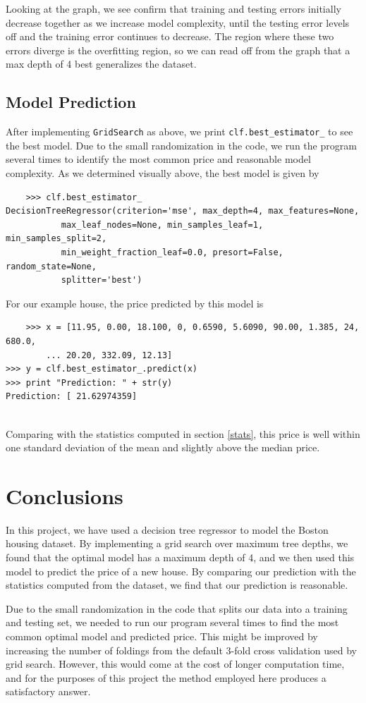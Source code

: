 \documentclass[12 pt]{article}
\numberwithin{equation}{section}
\begin{document}
Looking at the graph, we see confirm that training and testing errors initially decrease together as we increase model complexity, until the testing error levels off and the training error continues to decrease. The region where these two errors diverge is the overfitting region, so we can read off from the graph that a max depth of 4 best generalizes the dataset.

\newpage

\subsection{Model Prediction}
After implementing \texttt{GridSearch} as above, we print \texttt{clf.best\_estimator\_} to see the best model. Due to the small randomization in the code, we run the program several times to identify the most common price and reasonable model complexity. As we determined visually above, the best model is given by 

\begin{verbatim}
	>>> clf.best_estimator_
DecisionTreeRegressor(criterion='mse', max_depth=4, max_features=None,
           max_leaf_nodes=None, min_samples_leaf=1, min_samples_split=2,
           min_weight_fraction_leaf=0.0, presort=False, random_state=None,
           splitter='best')
\end{verbatim}
For our example house, the price predicted by this model is 
\begin{verbatim}
	>>> x = [11.95, 0.00, 18.100, 0, 0.6590, 5.6090, 90.00, 1.385, 24, 680.0,
	    ... 20.20, 332.09, 12.13]	
>>> y = clf.best_estimator_.predict(x)
>>> print "Prediction: " + str(y)
Prediction: [ 21.62974359]
    
\end{verbatim}
Comparing with the statistics computed in section \ref{stats}, this price is well within one standard deviation of the mean and slightly above the median price.

\section{Conclusions}\label{conclusions}
In this project, we have used a decision tree regressor to model the Boston housing dataset. By implementing a grid search over maximum tree depths, we found that the optimal model has a maximum depth of 4, and we then used this model to predict the price of a new house. By comparing our prediction with the statistics computed from the dataset, we find that our prediction is reasonable. 

Due to the small randomization in the code that splits our data into a training and testing set, we needed to run our program several times to find the most common optimal model and predicted price. This might be improved by increasing the number of foldings from the default 3-fold cross validation used by grid search. However, this would come at the cost of longer computation time, and for the purposes of this project the method employed here produces a satisfactory answer.
\end{document}
